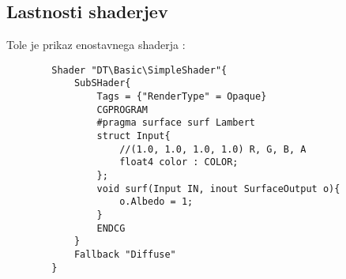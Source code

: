 {\color{indiagreen}\subsection{Lastnosti shaderjev}}
Tole je prikaz enostavnega shaderja \cite{shaders}:
\begin{verbatim}
		Shader "DT\Basic\SimpleShader"{
			SubSHader{
				Tags = {"RenderType" = Opaque}
				CGPROGRAM
				#pragma surface surf Lambert
				struct Input{
					//(1.0, 1.0, 1.0, 1.0) R, G, B, A
					float4 color : COLOR; 
				};
				void surf(Input IN, inout SurfaceOutput o){
					o.Albedo = 1;
				}
				ENDCG
			}
			Fallback "Diffuse"
		}
	\end{verbatim}